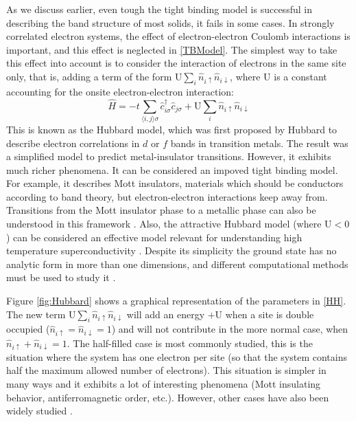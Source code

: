 As we discuss earlier, even tough the tight binding model is successful in describing the band structure of most solids, it fails in some cases. In strongly correlated electron systems, the effect of electron-electron Coulomb interactions is important, and this effect is neglected in \ref{TBModel}. The simplest way to take this effect into account is to consider the interaction of electrons in the same site only, that is, adding a term of the form $\text{U}\sum_i \hat{n}_{i\uparrow}\hat{n}_{i\downarrow}$, where $\text{U}$ is a constant accounting for the onsite electron-electron interaction:
\begin{equation}
\label{HH}
\hat{H} = -t\sum_{\langle i,j \rangle \sigma} \hat{c}^{\dagger}_{i\sigma}\hat{c}_{j\sigma} + \text{U}\sum_i \hat{n}_{i\uparrow}\hat{n}_{i\downarrow}
\end{equation}
This is known as the Hubbard model, which was first proposed by Hubbard \cite{Hubbard1963} to describe electron correlations in $d$ or $f$ bands in transition metals. The result was a simplified model to predict metal-insulator transitions. However, it exhibits much richer phenomena. It can be considered an impoved tight binding model. For example, it describes Mott insulators, materials which should be conductors according to band theory, but electron-electron interactions keep away from. Transitions from the Mott insulator phase to a metallic phase can also be understood in this framework \cite{Katsnelson1984}. Also, the attractive Hubbard model (where $\text{U} < 0$) can be considered an effective model relevant for understanding high temperature superconductivity \cite{Alexandrov1981}. Despite its simplicity the ground state has no analytic form in more than one dimensions, and different computational methods must be used to study it \cite{Vitali2019,Giuliani2007}.

 Figure \ref{fig:Hubbard} shows a graphical representation of the parameters in \ref{HH}. The new term $\text{U}\sum_i \hat{n}_{i\uparrow}\hat{n}_{i\downarrow}$ will add an energy $+\text{U}$ when a site is double occupied ($\hat{n}_{i\uparrow} = \hat{n}_{i\downarrow} = 1$) and will not contribute in the more normal case, when $\hat{n}_{i\uparrow} + \hat{n}_{i\downarrow} = 1$. The half-filled case is most commonly studied, this is the situation where the system has one electron per site (so that the system contains half the maximum allowed number of electrons). This situation is simpler in many ways and it exhibits a lot of interesting phenomena (Mott insulating behavior, antiferromagnetic order, etc.). However, other cases have also been widely studied \cite{Spalek2007}.

